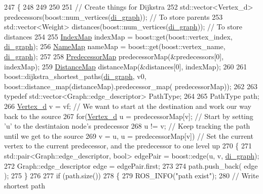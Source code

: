 \begin{DoxyCode}
247                                                       \{
248     
249 
250 
251     \textcolor{comment}{// Create things for Dijkstra}
252     std::vector<Vertex\_d> predecessors(boost::num\_vertices(\hyperlink{class_preplanner_af588e8495d5e78dd5a746f7c640daa4d}{di\_graph})); \textcolor{comment}{// To store parents}
253     std::vector<Weight> distances(boost::num\_vertices(\hyperlink{class_preplanner_af588e8495d5e78dd5a746f7c640daa4d}{di\_graph})); \textcolor{comment}{// To store distances}
254 
255     \hyperlink{_common_8h_a7fb6309a04472de0c8cb8c74ebf92c5e}{IndexMap} indexMap = boost::get(boost::vertex\_index, \hyperlink{class_preplanner_af588e8495d5e78dd5a746f7c640daa4d}{di\_graph});
256     \hyperlink{_common_8h_a7a347729377841627777cbe0a6becbf9}{NameMap} nameMap = boost::get(boost::vertex\_name, \hyperlink{class_preplanner_af588e8495d5e78dd5a746f7c640daa4d}{di\_graph});
257 
258     \hyperlink{_common_8h_a3e372f12838999c89bb6fafe2c9b4363}{PredecessorMap} predecessorMap(&predecessors[0], indexMap);
259     \hyperlink{_common_8h_acab893c91ba1c4e4415b652ccebeea6a}{DistanceMap} distanceMap(&distances[0], indexMap);    
260 
261     boost::dijkstra\_shortest\_paths(\hyperlink{class_preplanner_af588e8495d5e78dd5a746f7c640daa4d}{di\_graph}, v0, boost::distance\_map(distanceMap).predecessor\_map(
      predecessorMap));
262 
263     \textcolor{keyword}{typedef} std::vector<Graph::edge\_descriptor> PathType;
264 
265     PathType path;
266     \hyperlink{_common_8h_a1f671d518f573b692b5efa57ed576f36}{Vertex\_d} v = vf; \textcolor{comment}{// We want to start at the destination and work our way back to the source}
267     \textcolor{keywordflow}{for}(\hyperlink{_common_8h_a1f671d518f573b692b5efa57ed576f36}{Vertex\_d} u = predecessorMap[v]; \textcolor{comment}{// Start by setting 'u' to the destintaion node's
       predecessor}
268         u != v; \textcolor{comment}{// Keep tracking the path until we get to the source}
269         v = u, u = predecessorMap[v]) \textcolor{comment}{// Set the current vertex to the current predecessor, and the
       predecessor to one level up}
270     \{
271         std::pair<Graph::edge\_descriptor, bool> edgePair = boost::edge(u, v, 
      \hyperlink{class_preplanner_af588e8495d5e78dd5a746f7c640daa4d}{di\_graph});
272         Graph::edge\_descriptor edge = edgePair.first;
273 
274         path.push\_back( edge );
275     \}
276 
277     \textcolor{keywordflow}{if} (path.size())
278     \{
279        ROS\_INFO(\textcolor{stringliteral}{"path exist"});
280         \textcolor{comment}{// Write shortest path}

\end{DoxyCode}
